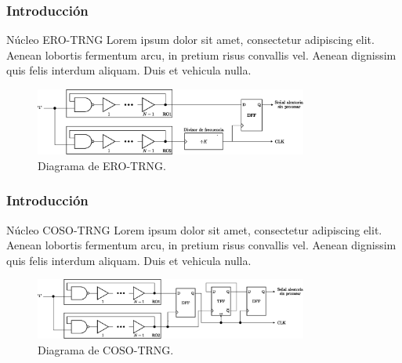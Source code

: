 \documentclass[10pt]{beamer}
\begin{document}
\begin{frame}
    \frametitle{Introducción}
    \begin{block}{Núcleo ERO-TRNG}
        \justifying
         Lorem ipsum dolor sit amet, consectetur adipiscing elit. Aenean lobortis fermentum arcu, in pretium risus convallis vel. Aenean dignissim quis felis interdum aliquam. Duis et vehicula nulla.   
	\end{block}
	\begin{figure}[hbtp]
	    \centering
	    \includegraphics[width=0.8\textwidth]{A1_ERO_TRNG}
	    \caption{Diagrama de ERO-TRNG.}
        \label{fig:A1_ERO_TRNG}
    \end{figure}
\end{frame}

\begin{frame}
    \frametitle{Introducción}
    \begin{block}{Núcleo COSO-TRNG}
        \justifying
         Lorem ipsum dolor sit amet, consectetur adipiscing elit. Aenean lobortis fermentum arcu, in pretium risus convallis vel. Aenean dignissim quis felis interdum aliquam. Duis et vehicula nulla.   
	\end{block}
	\begin{figure}[hbtp]
	    \centering
	    \includegraphics[width=0.8\textwidth]{A2_COSO_TRNG}
	    \caption{Diagrama de COSO-TRNG.}
        \label{fig:A2_COSO_TRNG}
    \end{figure}
\end{frame}
\end{document}
